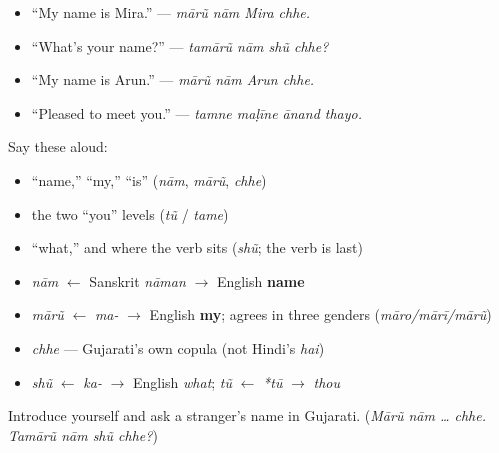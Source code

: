 \begin{itemize}
\raggedright
  \item \textquotedblleft{}My name is Mira.\textquotedblright{} — \emph{mārũ nām Mira chhe.}
  \item \textquotedblleft{}What's your name?\textquotedblright{} — \emph{tamārũ nām shũ chhe?}
  \item \textquotedblleft{}My name is Arun.\textquotedblright{} — \emph{mārũ nām Arun chhe.}
  \item \textquotedblleft{}Pleased to meet you.\textquotedblright{} — \emph{tamne maḷīne ānand thayo.}
\end{itemize}

\begin{cousinweb}
Say these aloud:

\begin{itemize}
\raggedright
  \item \textquotedblleft{}name,\textquotedblright{} \textquotedblleft{}my,\textquotedblright{} \textquotedblleft{}is\textquotedblright{} (\emph{nām}, \emph{mārũ}, \emph{chhe})
  \item the two \textquotedblleft{}you\textquotedblright{} levels (\emph{tũ} / \emph{tame})
  \item \textquotedblleft{}what,\textquotedblright{} and where the verb sits (\emph{shũ}; the verb is last)
\end{itemize}
\end{cousinweb}

\begin{grammarlens}[title={What you've built — roots you now carry}]
\begin{itemize}
\raggedright
  \item \emph{nām} $\leftarrow$ Sanskrit \emph{nāman} $\to$ English \textbf{name}
  \item \emph{mārũ} $\leftarrow$ \emph{ma-} $\to$ English \textbf{my}; agrees in three genders (\emph{māro/mārī/mārũ})
  \item \emph{chhe} — Gujarati's own copula (not Hindi's \emph{hai})
  \item \emph{shũ} $\leftarrow$ \emph{ka-} $\to$ English \emph{what}; \emph{tũ} $\leftarrow$ \emph{*tū} $\to$ \emph{thou}
\end{itemize}
\end{grammarlens}

\begin{tcolorbox}[breakable,colback=teal!4,colframe=teal!35!black,title={Before you move on}]
Introduce yourself and ask a stranger's name in Gujarati. (\emph{Mārũ nām … chhe. Tamārũ nām shũ chhe?})
\end{tcolorbox}
